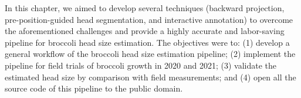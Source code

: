

In this chapter, we aimed to develop several techniques (backward projection, pre-position-guided head segmentation, and interactive annotation) to overcome the aforementioned challenges and provide a highly accurate and labor-saving pipeline for broccoli head size estimation. The objectives were to: (1) develop a general workflow of the broccoli head size estimation pipeline; (2) implement the pipeline for field trials of broccoli growth in 2020 and 2021; (3) validate the estimated head size by comparison with field measurements; and (4) open all the source code of this pipeline to the public domain. %

